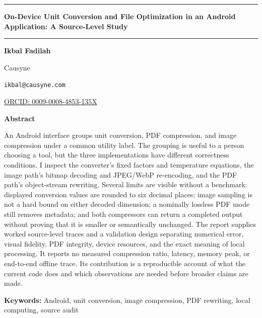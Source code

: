 \documentclass[10pt,letterpaper]{article}
\begin{document}
\begin{center}
\rule{\textwidth}{0.8pt}\par\vspace{0.6em}
{\LARGE\bfseries On-Device Unit Conversion and File Optimization in an Android Application: A Source-Level Study\par}
\vspace{0.6em}\rule{\textwidth}{0.4pt}\par\vspace{1.2em}
{\normalsize\bfseries Ikbal Fadilah\par}
Causyne\par
\texttt{ikbal@causyne.com}\par
\href{https://orcid.org/0009-0008-4853-135X}{ORCID: 0009-0008-4853-135X}\par
\end{center}
\vspace{1.0em}
\begin{center}
\begin{minipage}{0.82\textwidth}
\begin{center}\bfseries Abstract\end{center}
An Android interface groups unit conversion, PDF compression, and image compression under a common utility label. The grouping is useful to a person choosing a tool, but the three implementations have different correctness conditions. I inspect the converter's fixed factors and temperature equations, the image path's bitmap decoding and JPEG/WebP re-encoding, and the PDF path's object-stream rewriting. Several limits are visible without a benchmark: displayed conversion values are rounded to six decimal places; image sampling is not a hard bound on either decoded dimension; a nominally lossless PDF mode still removes metadata; and both compressors can return a completed output without proving that it is smaller or semantically unchanged. The report supplies worked source-level traces and a validation design separating numerical error, visual fidelity, PDF integrity, device resources, and the exact meaning of local processing. It reports no measured compression ratio, latency, memory peak, or end-to-end offline trace. Its contribution is a reproducible account of what the current code does and which observations are needed before broader claims are made.
\par\vspace{0.45em}\noindent\textbf{Keywords:} Android, unit conversion, image compression, PDF rewriting, local computing, source audit
\end{minipage}
\end{center}
\vspace{0.8em}
\end{document}
